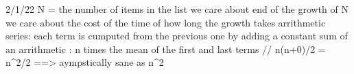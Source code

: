 2/1/22
N = the number of items in the list
we care about end of the growth of N
we care about the cost of the time of how long the growth takes 
arrithmetic series: each term is cumputed from the previous one by adding a constant 
sum of an arrithmetic : n times the mean of the first and last terms
// n(n+0)/2 = n^2/2 ==> aympstically sane as n^2
